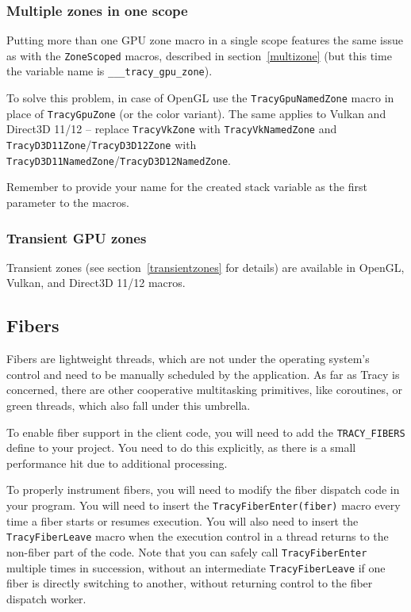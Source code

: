 \documentclass[hidelinks,titlepage,a4paper]{article}
\begin{document}
\subsubsection{Multiple zones in one scope}

Putting more than one GPU zone macro in a single scope features the same issue as with the \texttt{ZoneScoped} macros, described in section~\ref{multizone} (but this time the variable name is \texttt{\_\_\_tracy\_gpu\_zone}).

To solve this problem, in case of OpenGL use the \texttt{TracyGpuNamedZone} macro in place of \texttt{TracyGpuZone} (or the color variant). The same applies to Vulkan and Direct3D 11/12 -- replace \texttt{TracyVkZone} with \texttt{TracyVkNamedZone} and \texttt{TracyD3D11Zone}/\texttt{TracyD3D12Zone} with \texttt{TracyD3D11NamedZone}/\texttt{TracyD3D12NamedZone}.

Remember to provide your name for the created stack variable as the first parameter to the macros.

\subsubsection{Transient GPU zones}

Transient zones (see section~\ref{transientzones} for details) are available in OpenGL, Vulkan, and Direct3D 11/12 macros.

\subsection{Fibers}
\label{fibers}

Fibers are lightweight threads, which are not under the operating system's control and need to be manually scheduled by the application. As far as Tracy is concerned, there are other cooperative multitasking primitives, like coroutines, or green threads, which also fall under this umbrella.

To enable fiber support in the client code, you will need to add the \texttt{TRACY\_FIBERS} define to your project. You need to do this explicitly, as there is a small performance hit due to additional processing.

To properly instrument fibers, you will need to modify the fiber dispatch code in your program. You will need to insert the \texttt{TracyFiberEnter(fiber)} macro every time a fiber starts or resumes execution. You will also need to insert the \texttt{TracyFiberLeave} macro when the execution control in a thread returns to the non-fiber part of the code. Note that you can safely call \texttt{TracyFiberEnter} multiple times in succession, without an intermediate \texttt{TracyFiberLeave} if one fiber is directly switching to another, without returning control to the fiber dispatch worker.
\end{document}
